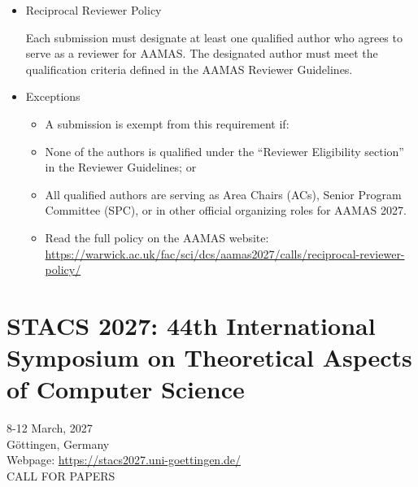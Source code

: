 \documentclass[prodmode,acmtecs]{acmsmall} %
\begin{document}
\begin{itemize}
  Thank you very much for considering contributing to AAMAS 2027. 
 
  Best regards, 
 
  AAMAS 2027 Program Chairs 
 
\item  Reciprocal Reviewer Policy 
 
  Each submission must designate at least one qualified author who agrees to serve as a reviewer for AAMAS. The designated author must meet the qualification criteria defined in the AAMAS Reviewer Guidelines.  
 
\item  Exceptions 
 
\begin{itemize}\item  A submission is exempt from this requirement if:
\item  None of the authors is qualified under the “Reviewer Eligibility section” in the Reviewer Guidelines; or
\item  All qualified authors are serving as Area Chairs (ACs), Senior Program Committee (SPC), or in other official organizing roles for AAMAS 2027.
\item  Read the full policy on the AAMAS website: \href{https://warwick.ac.uk/fac/sci/dcs/aamas2027/calls/reciprocal-reviewer-policy/}{https://warwick.ac.uk/fac/sci/dcs/aamas2027/calls/reciprocal-reviewer-policy/}
\end{itemize} 
\end{itemize}\section{STACS 2027: 44th International Symposium on Theoretical Aspects of Computer Science}\label{STACS2027}  8-12 March, 2027\\ 
  Göttingen, Germany\\ 
  Webpage: \href{https://stacs2027.uni-goettingen.de/}{https://stacs2027.uni-goettingen.de/}\\ 
CALL FOR PAPERS  
\end{document}
